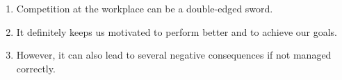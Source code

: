\documentclass[12pt,a4paper]{article}
\begin{document}
\begin{myfan}
 \begin{enumerate} 
\item Competition at the workplace can be a double-edged sword. \item It definitely keeps us motivated to perform better and to achieve our goals.
    \item However, it can also lead to several negative consequences if not managed correctly. 
\end{enumerate} 
\end{myfan} 
\end{document}
